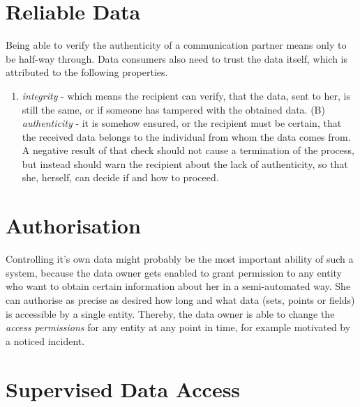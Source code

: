 \documentclass[12pt,english,a4paper,titlepage,cleardoublepage=empty,dottedtoc]{report}
\providecommand{\tightlist}{%
  \setlength{\itemsep}{0pt}\setlength{\parskip}{0pt}}
\begin{document}
\section{Reliable Data}\label{reliable-data}

Being able to verify the authenticity of a communication partner means
only to be half-way through. Data consumers also need to trust the data
itself, which is attributed to the following properties.

\begin{enumerate}
\def\labelenumi{(\Alph{enumi})}
\tightlist
\item
  \emph{integrity} - which means the recipient can verify, that the
  data, sent to her, is still the same, or if someone has tampered with
  the obtained data. (B) \emph{authenticity} - it is somehow ensured, or
  the recipient must be certain, that the received data belongs to the
  individual from whom the data comes from. A negative result of that
  check should not cause a termination of the process, but instead
  should warn the recipient about the lack of authenticity, so that she,
  herself, can decide if and how to proceed.
\end{enumerate}

\section{Authorisation}\label{authorisation}

Controlling it's own data might probably be the most important ability
of such a system, because the data owner gets enabled to grant
permission to any entity who want to obtain certain information about
her in a semi-automated way. She can authorise as precise as desired how
long and what data (sets, points or fields) is accessible by a single
entity. Thereby, the data owner is able to change the \emph{access
permissions} for any entity at any point in time, for example motivated
by a noticed incident.

\hypertarget{supervised-data-access}{\section{Supervised Data
Access}\label{supervised-data-access}}
\end{document}
